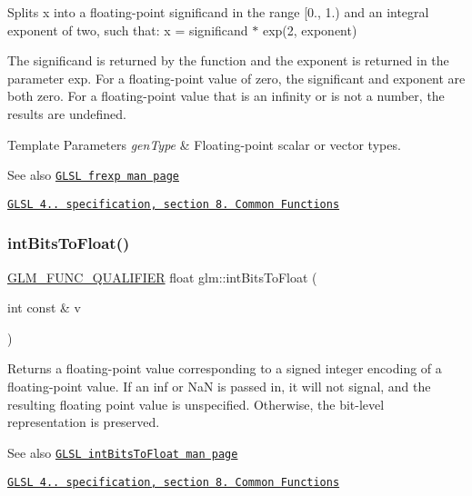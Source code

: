 Splits x into a floating-\/point significand in the range \mbox{[}0., 1.) and an integral exponent of two, such that\+: x = significand $\ast$ exp(2, exponent)

The significand is returned by the function and the exponent is returned in the parameter exp. For a floating-\/point value of zero, the significant and exponent are both zero. For a floating-\/point value that is an infinity or is not a number, the results are undefined.


\begin{DoxyTemplParams}{Template Parameters}
{\em gen\+Type} & Floating-\/point scalar or vector types.\\
\hline
\end{DoxyTemplParams}
\begin{DoxySeeAlso}{See also}
\href{http://www.opengl.org/sdk/docs/manglsl/xhtml/frexp.xml}{\tt G\+L\+SL frexp man page} 

\href{http://www.opengl.org/registry/doc/GLSLangSpec.4.20.8.pdf}{\tt G\+L\+SL 4.. specification, section 8. Common Functions} 
\end{DoxySeeAlso}
\mbox{\label{group__core__func__common_ga2650dc57b2148a6ffbce20944fb4d97a}} 
\subsubsection{\texorpdfstring{int\+Bits\+To\+Float()}{intBitsToFloat()}\hspace{0.1cm}{\footnotesize\ttfamily [1/2]}}
{\footnotesize\ttfamily \hyperlink{setup_8hpp_a33fdea6f91c5f834105f7415e2a64407}{G\+L\+M\+\_\+\+F\+U\+N\+C\+\_\+\+Q\+U\+A\+L\+I\+F\+I\+ER} float glm\+::int\+Bits\+To\+Float (\begin{DoxyParamCaption}\item[{int const \&}]{v }\end{DoxyParamCaption})}

Returns a floating-\/point value corresponding to a signed integer encoding of a floating-\/point value. If an inf or NaN is passed in, it will not signal, and the resulting floating point value is unspecified. Otherwise, the bit-\/level representation is preserved.

\begin{DoxySeeAlso}{See also}
\href{http://www.opengl.org/sdk/docs/manglsl/xhtml/intBitsToFloat.xml}{\tt G\+L\+SL int\+Bits\+To\+Float man page} 

\href{http://www.opengl.org/registry/doc/GLSLangSpec.4.20.8.pdf}{\tt G\+L\+SL 4.. specification, section 8. Common Functions} 
\end{DoxySeeAlso}
\mbox{\label{group__core__func__common_ga7a0a8291a1cf3e1c2aee33030a1bd7b0}} 
